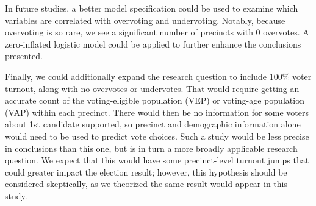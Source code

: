 \documentclass[12pt,twoside]{reedthesis}
\begin{document}
In future studies, a better model specification could be used to examine which variables are correlated with overvoting and undervoting. Notably, because overvoting is so rare, we see a significant number of precincts with 0 overvotes. A zero-inflated logistic model could be applied to further enhance the conclusions presented.

Finally, we could additionally expand the research question to include 100\% voter turnout, along with no overvotes or undervotes. That would require getting an accurate count of the voting-eligible population (VEP) or voting-age population (VAP) within each precinct. There would then be no information for some voters about 1st candidate supported, so precinct and demographic information alone would need to be used to predict vote choices. Such a study would be less precise in conclusions than this one, but is in turn a more broadly applicable research question. We expect that this would have some precinct-level turnout jumps that could greater impact the election result; however, this hypothesis should be considered skeptically, as we theorized the same result would appear in this study.

\appendix
\end{document}
